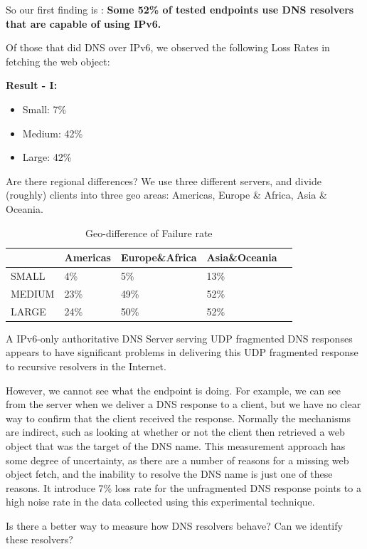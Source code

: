 So our first finding is : \textbf{Some 52\% of tested endpoints use DNS resolvers 
that are capable of using IPv6.}

Of those that did DNS over IPv6, we observed the following Loss	Rates in fetching the web object:

\textbf{Result - I:}
\begin{itemize}
  \item Small: 	7\%
  \item Medium: 42\%
  \item Large: 42\%
\end{itemize}
Are	there regional differences? We use three different servers,	
and	divide (roughly) clients into three	geo	areas: Americas, 
Europe \& Africa, Asia \& Oceania.

\begin{table}[]
	\caption{Geo-difference of Failure rate}
	\centering
\begin{tabular}{@{}lllll@{}}
\toprule
          & Americas & Europe\&Africa & Asia\&Oceania &  \\ \midrule
SMALL     & 4\%      & 5\%    & 13\% &  \\
MEDIUM    & 23\%      & 49\%   & 52\% &  \\
LARGE     & 24\%      & 50\%   & 52\% &  \\ \bottomrule
\end{tabular}
\end{table}

A IPv6-only authoritative DNS Server serving UDP fragmented	DNS	
responses appears to have significant problems in delivering this 
UDP fragmented response to recursive resolvers in the Internet. 

However, we cannot see what the endpoint is doing. For example, 
we can see from the server when we deliver a DNS response to a client, 
but we have no clear way to confirm that the client received the 
response. Normally the mechanisms are indirect, such as looking at 
whether or not the client then retrieved a web object that was the 
target of the DNS name. This measurement approach has some degree of 
uncertainty, as there are a number of reasons for a missing web object 
fetch, and the inability to resolve the DNS name is just one of these 
reasons. It introduce 7\% loss rate for the unfragmented DNS response 
points to a	high noise rate in the data	collected using	this experimental 
technique.

Is there a better way to measure how DNS resolvers behave? Can we identify 
these resolvers?

